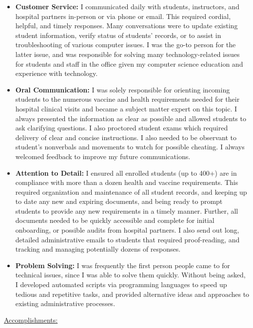 \documentclass[11pt]{article}
\def\accomplishments{
    \toplistspacing
    \underline{Accomplishments:}
    \toplistspacing
}
\newcommand{\toplistspacing}{
    \vspace{0.04in}
}
\begin{document}
    \begin{itemize}[noitemsep,nolistsep]
        \item \textbf{Customer Service:} I communicated daily with students, instructors, and hospital partners in-person or via phone or email. This required cordial, helpful, and timely responses. Many conversations were to update existing student information, verify status of students' records, or to assist in troubleshooting of various computer issues. 
        I was the go-to person for the latter issue, and was responsible for solving many technology-related issues for students and staff in the office given my computer science education and experience with technology.
        \item \textbf{Oral Communication:} I was solely responsible for orienting incoming students to the numerous vaccine and health requirements needed for their hospital clinical visits and became a subject matter expert on this topic. I always presented the information as clear as possible and allowed students to ask clarifying questions. I also proctored student exams which required delivery of clear and concise instructions.
        I also needed to be observant to student's nonverbals and movements to watch for possible cheating. I always welcomed feedback to improve my future communications. 
        \item \textbf{Attention to Detail:} I ensured all enrolled students (up to 400+) are in compliance with more than a dozen health and vaccine requirements. This required organization and maintenance of all student records, and keeping up to date any new and expiring documents, and being ready to prompt students to provide any new requirements in a timely manner. Further, all documents needed to be quickly accessible and complete for initial onboarding, or possible audits from hospital partners.
        I also send out long, detailed administrative emails to students that required proof-reading, and tracking and managing potentially dozens of responses.
        \item \textbf{Problem Solving:} I was frequently the first person people came to for technical issues, since I was able to solve them quickly. Without being asked, I developed automated scripts via programming languages to speed up tedious and repetitive tasks, and provided alternative ideas and approaches to existing administrative processes.
    \end{itemize}
    \accomplishments
\end{document}
